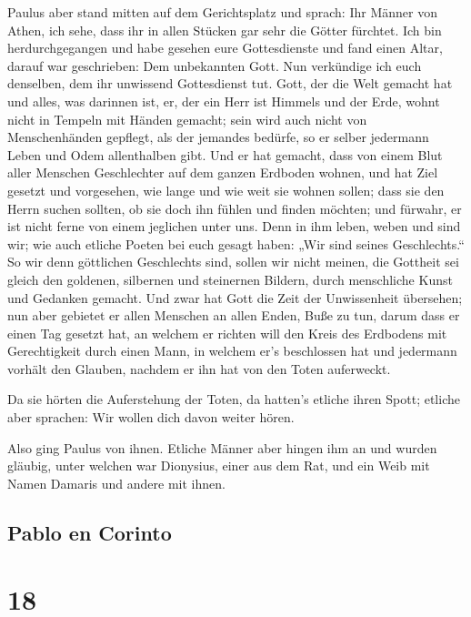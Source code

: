  Paulus aber stand mitten auf dem Gerichtsplatz und
sprach: Ihr Männer von Athen, ich sehe, dass ihr in allen Stücken gar
sehr die Götter fürchtet.  Ich bin herdurchgegangen und
habe gesehen eure Gottesdienste und fand einen Altar, darauf war
geschrieben: Dem unbekannten Gott. Nun verkündige ich euch denselben,
dem ihr unwissend Gottesdienst tut.  Gott, der die Welt
gemacht hat und alles, was darinnen ist, er, der ein Herr ist Himmels
und der Erde, wohnt nicht in Tempeln mit Händen gemacht; 
sein wird auch nicht von Menschenhänden gepflegt, als der jemandes
bedürfe, so er selber jedermann Leben und Odem allenthalben gibt.
 Und er hat gemacht, dass von einem Blut aller Menschen
Geschlechter auf dem ganzen Erdboden wohnen, und hat Ziel gesetzt und
vorgesehen, wie lange und wie weit sie wohnen sollen; 
dass sie den Herrn suchen sollten, ob sie doch ihn fühlen und finden
möchten; und fürwahr, er ist nicht ferne von einem jeglichen unter uns.
 Denn in ihm leben, weben und sind wir; wie auch etliche
Poeten bei euch gesagt haben: „Wir sind seines Geschlechts.``
 So wir denn göttlichen Geschlechts sind, sollen wir
nicht meinen, die Gottheit sei gleich den goldenen, silbernen und
steinernen Bildern, durch menschliche Kunst und Gedanken gemacht.
 Und zwar hat Gott die Zeit der Unwissenheit übersehen;
nun aber gebietet er allen Menschen an allen Enden, Buße zu tun,
 darum dass er einen Tag gesetzt hat, an welchem er
richten will den Kreis des Erdbodens mit Gerechtigkeit durch einen Mann,
in welchem er's beschlossen hat und jedermann vorhält den Glauben,
nachdem er ihn hat von den Toten auferweckt.

 Da sie hörten die Auferstehung der Toten, da hatten's
etliche ihren Spott; etliche aber sprachen: Wir wollen dich davon weiter
hören.

 Also ging Paulus von ihnen.  Etliche
Männer aber hingen ihm an und wurden gläubig, unter welchen war
Dionysius, einer aus dem Rat, und ein Weib mit Namen Damaris und andere
mit ihnen.

\hypertarget{pablo-en-corinto}{%
\subsection{Pablo en Corinto}\label{pablo-en-corinto}}

\hypertarget{section-17}{%
\section{18}\label{section-17}}

